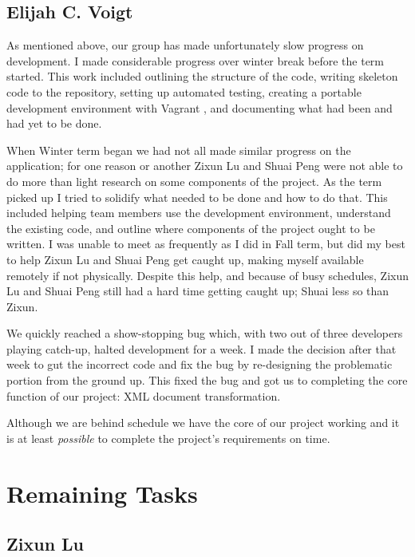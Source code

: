 \subsection{Elijah C. Voigt}

As mentioned above, our group has made unfortunately slow progress on development.
I made considerable progress over winter break before the term started.
This work included outlining the structure of the code, writing skeleton code to the repository, setting up automated testing, creating a portable development environment with Vagrant \cite{vagrant}, and documenting what had been and had yet to be done.

When Winter term began we had not all made similar progress on the application; for one reason or another Zixun Lu and Shuai Peng were not able to do more than light research on some components of the project.
As the term picked up I tried to solidify what needed to be done and how to do that.
This included helping team members use the development environment, understand the existing code, and outline where components of the project ought to be written.
I was unable to meet as frequently as I did in Fall term, but did my best to help Zixun Lu and Shuai Peng get caught up, making myself available remotely if not physically.
Despite this help, and because of busy schedules, Zixun Lu and Shuai Peng still had a hard time getting caught up; Shuai less so than Zixun.

We quickly reached a show-stopping bug which, with two out of three developers playing catch-up, halted development for a week.
I made the decision after that week to gut the incorrect code and fix the bug by re-designing the problematic portion from the ground up.
This fixed the bug and got us to completing the core function of our project: XML document transformation.

Although we are behind schedule we have the core of our project working and it is at least \textit{possible} to complete the project's requirements on time.

\section{Remaining Tasks}

\subsection{Zixun Lu}

